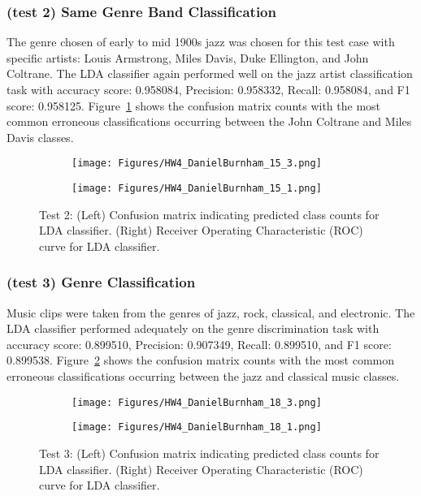 \documentclass{article}
\begin{document}
\subsubsection{(test 2) Same Genre Band Classification}
The genre chosen of early to mid 1900s jazz was chosen for this test case with specific artists: Louis Armstrong, Miles Davis, Duke Ellington, and John Coltrane. The LDA classifier again performed well on the jazz artist classification task with accuracy score: 0.958084, Precision: 0.958332, Recall: 0.958084, and F1 score: 0.958125. Figure~\ref{fig:LDAtest2} shows the confusion matrix counts with the most common erroneous classifications occurring between the John Coltrane and Miles Davis classes.
\begin{figure}
\centering
   \begin{subfigure}{0.49\linewidth} \centering
     \texttt{[image: Figures/HW4\_DanielBurnham\_15\_3.png]}
   \end{subfigure}
   \begin{subfigure}{0.49\linewidth} \centering
     \texttt{[image: Figures/HW4\_DanielBurnham\_15\_1.png]}
   \end{subfigure}
\caption{Test 2: (Left) Confusion matrix indicating predicted class counts for LDA classifier. (Right) Receiver Operating Characteristic (ROC) curve for LDA classifier.} \label{fig:LDAtest2}
\end{figure}
\subsubsection{(test 3) Genre Classification}
Music clips were taken from the genres of jazz, rock, classical, and electronic. The LDA classifier performed adequately on the genre discrimination task with accuracy score: 0.899510, Precision: 0.907349, Recall: 0.899510, and F1 score: 0.899538. Figure~\ref{fig:LDAtest3} shows the confusion matrix counts with the most common erroneous classifications occurring between the jazz and classical music classes.
\begin{figure}
\centering
   \begin{subfigure}{0.49\linewidth} \centering
     \texttt{[image: Figures/HW4\_DanielBurnham\_18\_3.png]}
   \end{subfigure}
   \begin{subfigure}{0.49\linewidth} \centering
     \texttt{[image: Figures/HW4\_DanielBurnham\_18\_1.png]}
   \end{subfigure}
\caption{Test 3: (Left) Confusion matrix indicating predicted class counts for LDA classifier. (Right) Receiver Operating Characteristic (ROC) curve for LDA classifier.} \label{fig:LDAtest3}
\end{figure}
\end{document}
